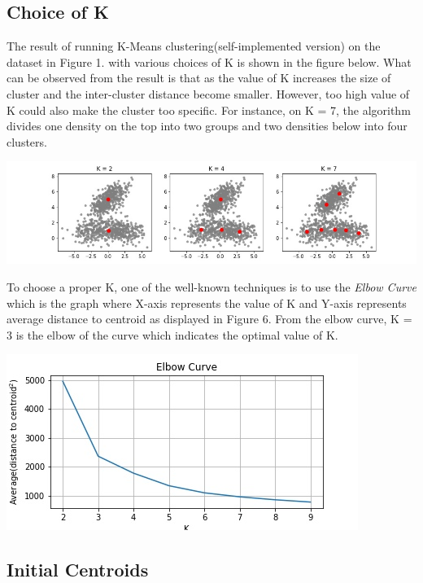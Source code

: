 \documentclass{article}
\begin{document}
\subsection{Choice of K}
The result of running K-Means clustering(self-implemented version) on the dataset in Figure 1. with various choices of K is shown in the figure below. What can be observed from the result is that as the value of K increases the size of cluster and the inter-cluster distance become smaller. However, too high value of K could also make the cluster too specific. For instance, on K = 7, the algorithm divides one density on the top into two groups and two densities below into four clusters.
\begin{center}
\includegraphics[scale=0.4]{multiple_k}
\end{center}

To choose a proper K, one of the well-known techniques is to use the \textit{Elbow Curve} which is the graph where X-axis represents the value of K and Y-axis represents average distance to centroid as displayed in Figure 6. From the elbow curve, K = 3 is the elbow of the curve which indicates the optimal value of K.\\
\begin{center}
\includegraphics[scale=0.3]{elbow}
\end{center}

\subsection{Initial Centroids}
\end{document}
